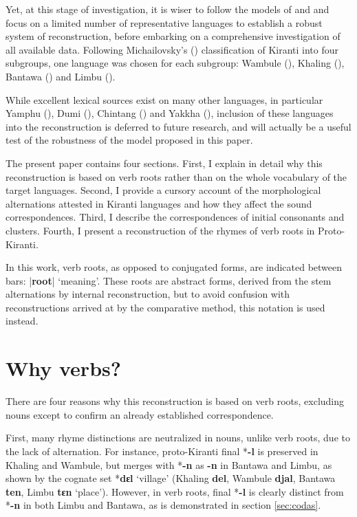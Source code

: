 \documentclass[oneside,a4paper,11pt]{article}
\newcommand{\ipa}[1]{\textbf{{\phon\mbox{#1}}}} %
\newcommand{\dhatu}[2]{|\ipa{#1}| `#2'}
\begin{document}
Yet, at this stage of investigation, it is wiser to follow the models of \citet{bloomfield25central} and \citet{dempwolff34induktiver} and focus on a limited number of representative languages to establish a robust system of reconstruction, before embarking on a comprehensive investigation of all available data. Following Michailovsky's (\citeyear{michailovsky94stops}) classification of Kiranti into four subgroups, one language was chosen for each subgroup: Wambule (\citealt{opgenort04wambule}), Khaling (\citealt{jacques12khaling, jacques15khaling}), Bantawa (\citealt{doornenbal09}) and Limbu (\citealt{driem87, michailovsky02dico}). 

While excellent lexical sources exist on many other languages, in particular  Yamphu (\citealt{rutgers98yamphu}), Dumi  (\citealt{driem93dumi, rai11dumi}), Chintang  (\citealt{rai11chintang}) and  Yakkha  (\citealt{kongren07yakkha}), inclusion of these languages into the reconstruction is deferred to future research, and will actually be a useful test of the robustness of the model proposed in this paper.

The present paper contains four sections. First, I explain in detail why this reconstruction is based on verb roots rather than on the whole vocabulary of the target languages. Second, I provide a cursory account of the morphological alternations attested in Kiranti languages and how they affect the sound correspondences. Third, I describe the correspondences of initial consonants and clusters. Fourth, I present a reconstruction of the rhymes of verb roots in Proto-Kiranti.

In this work, verb roots, as opposed to conjugated forms, are indicated between bars: \dhatu{root}{meaning}. These roots are abstract forms, derived from the stem alternations by internal reconstruction, but to avoid confusion with reconstructions arrived at by the comparative method, this notation is used instead. 

\section{Why verbs?} \label{sec:why}

There are four reasons why this reconstruction is based on verb roots, excluding nouns except to confirm an already established correspondence.

First,  many rhyme distinctions are neutralized in nouns, unlike verb roots, due to the lack of alternation. For instance, proto-Kiranti final *\ipa{-l} is preserved in Khaling and Wambule, but merges with *\ipa{-n} as \ipa{-n} in Bantawa and Limbu, as shown by the cognate set *\ipa{dɛl} `village' (Khaling \ipa{del}, Wambule \ipa{djal}, Bantawa \ipa{ten}, Limbu \ipa{tɛn} `place'). However, in verb roots, final *\ipa{-l} is clearly distinct from *\ipa{-n} in both Limbu and Bantawa, as is demonstrated in section \ref{sec:codas}.
\end{document}
